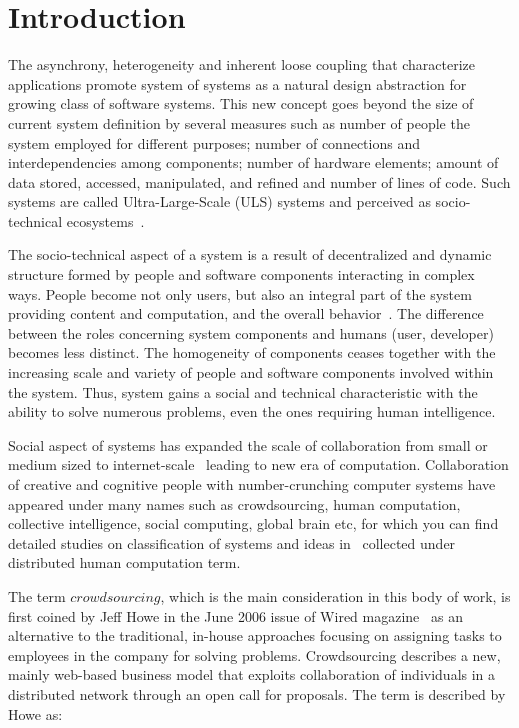 \chapter{Introduction} 


The asynchrony, heterogeneity and inherent loose coupling that characterize applications 
promote system of systems as a natural design abstraction for growing class of software 
systems. This new concept goes beyond the size of current system definition by several 
measures such as 
number of people the system employed for different purposes; 
number of connections and interdependencies among components; 
number of hardware elements; 
amount of data stored, accessed, manipulated, and refined 
and number of lines of code. Such systems are called 
Ultra-Large-Scale (ULS) systems and perceived as socio-technical 
ecosystems~\cite{ULSReport}.

The socio-technical aspect of a system is a result of decentralized and dynamic 
structure formed by people and software components interacting in complex ways. 
People become not only users, but also an integral part of the system providing 
content and computation, and the overall behavior~\cite{ULSReport}. 
The difference between the roles concerning system components and 
humans (user, developer) becomes less distinct. The homogeneity 
of components ceases together with the increasing scale and variety of people 
and software components involved within the system. Thus, system gains a social 
and technical characteristic with the ability to solve numerous problems, 
even the ones requiring human intelligence.

Social aspect of systems has expanded the scale of collaboration from small or 
medium sized to internet-scale~\cite{Dorn2012b} leading to new era of computation. 
Collaboration of creative and cognitive people with number-crunching 
computer systems have appeared under many names such as crowdsourcing, 
human computation, collective intelligence, social computing, global brain etc, 
for which you can find detailed studies on classification of systems and ideas 
in~\cite{Quinn2009, Quinn2011} collected under distributed human computation term.

The term $crowdsourcing$, which is the main consideration in this body of work, 
is first coined by Jeff Howe in the June 2006 issue of Wired magazine~\cite{Howe2006b} 
as an alternative to the traditional, in-house approaches focusing on assigning tasks 
to employees in the company for solving problems. Crowdsourcing describes a new, 
mainly web-based business model that exploits collaboration of individuals in a 
distributed network through an open call for proposals. The term is described by Howe as:


